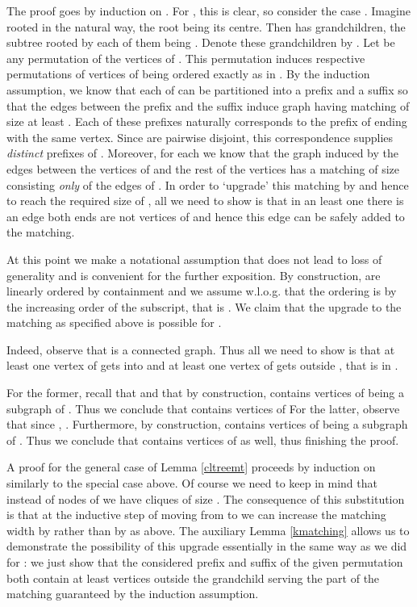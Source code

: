 \documentclass{article}
\begin{document}
The proof goes by induction on . For , this is clear,
so consider the case . Imagine  rooted in the natural way, the root being its centre.
Then  has  grandchildren, the subtree rooted by each of them being
. Denote these grandchildren by .
Let  be any permutation of the vertices of . This permutation induces
respective permutations  of vertices of 
being ordered exactly as in . By the induction assumption, we know that
each of  can be partitioned into a prefix and a suffix
so that the edges between the prefix and the suffix induce graph having
matching of size at least . Each of these prefixes naturally corresponds
to the prefix of  ending with the same vertex. Since  are 
pairwise disjoint, this correspondence supplies  \emph{distinct} prefixes 
 of .
Moreover, for each  we know that the graph  induced by the edges between the
vertices of  and the rest of the vertices has a matching of size  consisting 
\emph{only} of the edges of . In order to `upgrade' this
matching by  and hence to reach the required size of , all we need to show is that
in an least one  there is an edge both ends are not vertices of  and hence this
edge can be safely added to the matching. 

At this point we make a notational assumption that does not lead to loss of generality 
and is convenient for the further exposition. By construction, 
are linearly ordered by containment and we assume w.l.o.g. that the ordering is by the increasing 
order of the subscript, that is . 
We claim that the upgrade to the matching as specified above is possible for .

Indeed, observe that  is a connected graph. Thus all we need to show
is that at least one vertex of  gets into  and at least one
vertex of  gets outside , that is in .

For the former, recall that  and that by construction, 
contains  vertices of  being a subgraph of .
Thus we conclude that  contains vertices of 
For the latter, observe that since , . Furthermore, by construction,  contains
 vertices of  being a subgraph of . 
Thus we conclude that  contains vertices of  as well,
thus finishing the proof. 

A proof for the general case of Lemma \ref{cltreemt} proceeds by induction on  similarly
to the special case above. Of course we need to keep in mind that instead of nodes of 
we have cliques of size . The consequence of this substitution is that at the inductive step
of moving from  to  we can increase the matching width by  rather than by 
as above. The auxiliary Lemma \ref{kmatching} allows us to demonstrate the possibility of this
upgrade essentially in the same way as we did for : we just show that the considered prefix 
and suffix of the given permutation both contain at least  vertices outside the grandchild
serving the part of the matching guaranteed by the induction assumption. 
\end{document}
